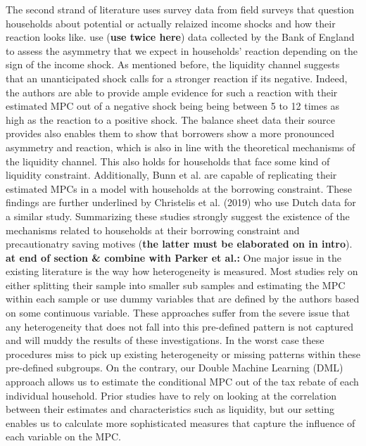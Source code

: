 The second strand of literature uses survey data from field surveys that question households about potential or actually relaized income shocks and how their reaction looks like. \cite{bunn_etal} use (\textbf{use twice here}) data collected by the Bank of England to assess the asymmetry that we expect in households' reaction depending on the sign of the income shock. As mentioned before, the liquidity channel suggests that an unanticipated shock calls for a stronger reaction if its negative. Indeed, the authors are able to provide ample evidence for such a reaction with their estimated MPC out of a negative shock being being between 5 to 12 times as high as the reaction to a positive shock. The balance sheet data their source provides also enables them to show that borrowers show a more pronounced asymmetry and reaction, which is also in line with the theoretical mechanisms of the liquidity channel. This also holds for households that face some kind of liquidity constraint. Additionally, Bunn et al. are capable of replicating their estimated MPCs in a model with households at the borrowing constraint. These findings are further underlined by Christelis et al. (2019) who use Dutch data for a similar study. Summarizing these studies strongly suggest the existence of the mechanisms related to households at their borrowing constraint and precautionatry saving motives (\textbf{the latter must be elaborated on in intro}). \\
\textbf{at end of section \& combine with Parker et al.:} One major issue in the existing literature is the way how heterogeneity is measured. Most studies rely on either splitting their sample into smaller sub samples and estimating the MPC within each sample or use dummy variables that are defined by the authors based on some continuous variable. These approaches suffer from the severe issue that any heterogeneity that does not fall into this pre-defined pattern is not captured and will muddy the results of these investigations. In the worst case these procedures miss to pick up existing heterogeneity or missing patterns within these pre-defined subgroups. On the contrary, our Double Machine Learning (DML) approach allows us to estimate the conditional MPC out of the tax rebate of each individual household. Prior studies have to rely on looking at the correlation between their estimates and characteristics such as liquidity, but our setting enables us to calculate more sophisticated measures that capture the influence of each variable on the MPC. \\
